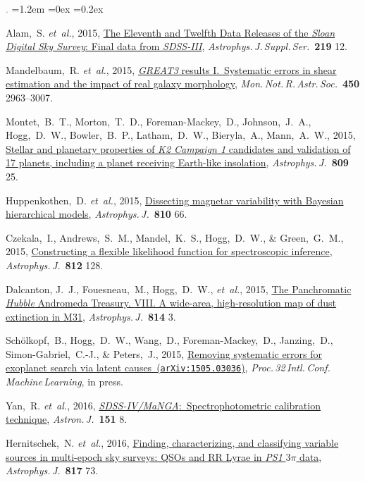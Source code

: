 \documentclass[10pt,letterpaper]{article}
\newcommand{\acronym}[1]{{\small{#1}}}
\newcommand{\foreign}[1]{\textsl{#1}}
\newcommand{\etal}{\foreign{et~al.}}
\newcommand{\project}[1]{\textsl{#1}}
\newcommand{\doi}[2]{\href{http://dx.doi.org/#1}{{#2}}}
\newcommand{\arxiv}[2]{\href{http://arxiv.org/abs/#1}{{#2}\ (\texttt{arXiv:#1})}}
\newcommand{\deemph}[1]{\textcolor{grey}{\footnotesize{#1}}}
\newcommand{\pubnumber}[1]{\deemph{{#1}.}}
\newcounter{refpubnum}
\newcommand{\hogglist}{%
    \rightmargin=0in
    \leftmargin=1.2em
    \topsep=0ex
    \partopsep=0pt
    \itemsep=0.2ex
    \parsep=0pt
    \itemindent=-1.0\leftmargin
    \listparindent=0.0\leftmargin
    \settowidth{\labelsep}{~}
    \usecounter{refpubnum}
  }
\begin{document}
\begin{list}{\pubnumber{\therefpubnum}}{\hogglist}
\item
Alam,~S. \etal, 2015,
\doi{10.1088/0067-0049/219/1/12}{The Eleventh and Twelfth Data Releases of the \project{Sloan Digital Sky Survey}: Final data from \project{\acronym{SDSS-III}}},
\textit{Astrophys.\,J.\,Suppl.\,Ser.}\ \textbf{219} 12.
\item
Mandelbaum,~R. \etal, 2015,
\doi{10.1093/mnras/stv781}{\project{\acronym{GREAT3}} results \acronym{I}.\ Systematic errors in shear
estimation and the impact of real galaxy morphology},
\textit{Mon.\,Not.\,R.\,Astr.\,Soc.}\ \textbf{450} 2963--3007.
\item
Montet,~B.~T., Morton,~T.~D., Foreman-Mackey,~D., Johnson,~J.~A., Hogg,~D.~W.,
Bowler,~B.~P., Latham,~D.~W., Bieryla,~A., Mann,~A.~W., 2015,
\doi{10.1088/0004-637X/809/1/25}{Stellar and planetary properties of
\project{K2 Campaign 1} candidates and validation of 17 planets,
including a planet receiving Earth-like insolation},
\textit{Astrophys.\,J.}\ \textbf{809} 25.
\item
Huppenkothen,~D. \etal, 2015,
\doi{10.1088/0004-637X/810/1/66}{Dissecting magnetar variability with
  Bayesian hierarchical models},
\textit{Astrophys.\,J.}\ \textbf{810} 66.
\item
Czekala,~I., Andrews,~S.~M., Mandel,~K.~S., Hogg,~D.~W., \& Green,~G.~M., 2015,
\doi{10.1088/0004-637X/812/2/128}{Constructing a flexible likelihood
  function for spectroscopic inference},
\textit{Astrophys.\,J.}\ \textbf{812} 128.
\item
Dalcanton, J.~J., Fouesneau,~M., Hogg,~D.~W., \etal, 2015,
\doi{10.1088/0004-637X/814/1/3}{The Panchromatic \project{Hubble} Andromeda Treasury. \acronym{VIII}.
A wide-area, high-resolution map of dust extinction in M31},
\textit{Astrophys.\,J.}\ \textbf{814} 3.
\item
Sch\"olkopf,~B., Hogg,~D.~W., Wang,~D., Foreman-Mackey,~D., Janzing,~D.,
Simon-Gabriel,~C.-J., \& Peters,~J., 2015,
\arxiv{1505.03036}{Removing systematic errors for exoplanet search via latent causes},
\textit{Proc.\,32\,Intl.\,Conf.\,Machine\,Learning}, in press.
\item
Yan,~R. \etal, 2016,
\doi{10.3847/0004-6256/151/1/8}{\project{\acronym{SDSS-IV/MaNGA}}:\ Spectrophotometric calibration technique},
\textit{Astron.\,J.}\ \textbf{151} 8.
\item
Hernitschek,~N. \etal, 2016,
\doi{10.3847/0004-637X/817/1/73}{Finding, characterizing, and classifying variable sources in
multi-epoch sky surveys: QSOs and RR Lyrae in \project{PS1} $3\pi$ data},
\textit{Astrophys.\,J.}\ \textbf{817} 73.

\end{list}
\end{document}
